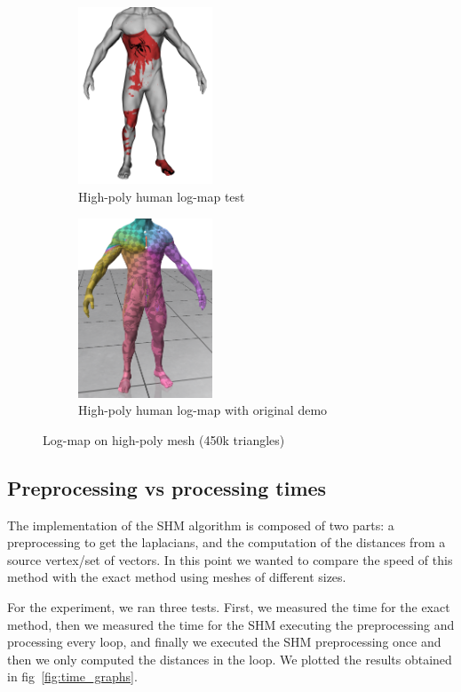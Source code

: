 \documentclass[sigconf]{acmart}
\begin{document}
\begin{figure}[htbp]
  \centering
  \hfill
  \begin{subfigure}[b]{0.23\textwidth}
    \centering
    \includegraphics[width=4cm]{human_spiderman_high.png}
    \caption{High-poly human log-map test}
    \label{fig:high_poly_human}
  \end{subfigure}
  \begin{subfigure}[b]{0.23\textwidth}
    \centering
    \includegraphics[width=4cm]{log_map_wrong.png}
    \caption{High-poly human log-map with original demo}
    \label{fig:high_poly_human_original_demo}
  \end{subfigure}
  \caption{Log-map on high-poly mesh (450k triangles)}
  \label{fig:cut_locus_vectors}
\end{figure}

\subsection{Preprocessing vs processing times}

The implementation of the SHM algorithm is composed of two parts:
a preprocessing to get the laplacians, and the computation of the 
distances from a source vertex/set of vectors. In this point we wanted to compare the speed of this method with
the exact method using meshes of different sizes. 

For the experiment, we ran three tests. First, we measured the time for the exact method,
then we measured the time for the SHM executing the preprocessing and processing
every loop, and finally we executed the SHM preprocessing once and then we only computed
the distances in the loop. We plotted the results obtained in fig~\ref{fig:time_graphs}. 
\end{document}
